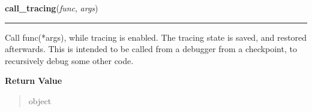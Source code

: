     \label{sys:call_tracing}

    \vspace{0.5ex}

\hspace{.8\funcindent}\begin{boxedminipage}{\funcwidth}

    \raggedright \textbf{call\_tracing}(\textit{func}, \textit{args})

    \vspace{-1.5ex}

    \rule{\textwidth}{0.5\fboxrule}
\setlength{\parskip}{2ex}
    Call func(*args), while tracing is enabled.  The tracing state is 
    saved, and restored afterwards.  This is intended to be called from a 
    debugger from a checkpoint, to recursively debug some other code.

\setlength{\parskip}{1ex}
      \textbf{Return Value}
    \vspace{-1ex}

      \begin{quote}
      object

      \end{quote}

    \end{boxedminipage}

    \label{sys:callstats}

    \vspace{0.5ex}

